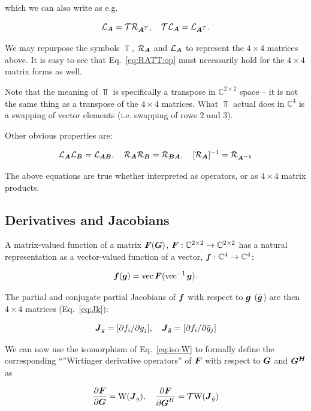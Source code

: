 \documentclass[useAMS,usenatbib]{mn2e}
\newcommand{\COMPLEX}{\mathbb{C}}
\newcommand{\mat}[1]{{\bmath{#1}}}
\newcommand{\JJ}{\mat{J}} %
\begin{document}
which we can also write as e.g.

\begin{equation}
\label{eq:RATT:op}
\Lop{\mat{A}} = \Top \Rop{\mat{A}^T},~~~\Top\Lop{\mat{A}} = \Lop{\mat{A}^T}.
\end{equation}

We may repurpose the symbols $\Top$, $\Rop{\mat{A}}$ and $\Lop{\mat{A}}$ to represent the $4\times4$ matrices above. It
is easy to see that Eq.~\ref{eq:RATT:op} must necessarily hold for the $4\times4$ matrix forms as well.

Note that the meaning of $\Top$ is specifically a transpose in $\COMPLEX^{2\times2}$ space -- it is not the same
thing as a transpose of the $4\times4$ matrices. What $\Top$ actual does in $\COMPLEX^4$ is a swapping of vector 
elements (i.e. swapping of rows 2 and 3). 

Other obvious properties are:

\begin{equation}
\label{eq:RAB:LAB}
\Lop{\mat{A}}\Lop{\mat{B}} = \Lop{\mat{AB}},~~~\Rop{\mat{A}}\Rop{\mat{B}} = \Rop{\mat{BA}},~~~[\Rop{\mat{A}}]^{-1} = \Rop{\mat{A^{-1}}}
\end{equation}

The above equations are true whether interpreted as operators, or as $4\times4$ matrix products.

\subsection{Derivatives and Jacobians}

A matrix-valued function of a matrix $\mat{F}(\mat{G})$, $\mat{F}:\COMPLEX^{2\times2}\to\COMPLEX^{2\times2}$ has a natural
representation as a vector-valued function of a vector, $\bmath{f}:\COMPLEX^4\to\COMPLEX^4$:

\[
\bmath{f}(\bmath{g}) = \VEC{\mat{F}(\VECINV{\bmath{g}})}.
\]

The partial and conjugate partial Jacobians of $\bmath{f}$ with respect to $\bmath{g}$ ($\bar{\bmath{g}}$) are then $4\times4$ matrices (Eq.~\ref{eq:Jk}):

\[
\JJ_g = [ \partial f_i / \partial g_j ],~~~\JJ_{\bar{g}} = [ \partial f_i / \partial \bar{g}_j ]
\]

We can now use the isomorphism of Eq.~\ref{eq:iso:W} to formally define the corresponding ``''Wirtinger derivative operators'' 
of $\mat{F}$ with respect to $\mat{G}$ and $\mat{G^H}$ as

\begin{equation}
\label{eq:def:dF:dG}
\frac{\partial\mat{F}}{\partial{\mat{G}}} = \mathrm{W}(\JJ_g),~~~
\frac{\partial\mat{F}}{\partial{\mat{G}^H}} = \Top \mathrm{W}(\JJ_{\bar{g}})
\end{equation}
\end{document}
